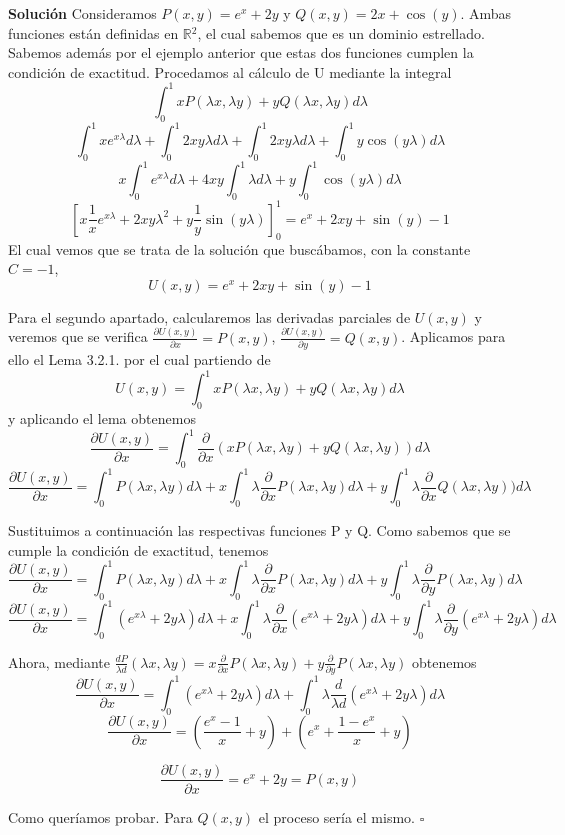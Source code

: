 \documentclass[fleqn]{article}
\newcommand*{\QED}{\hfill\ensuremath{\square}}
\def\R{$\mathds{R}$}
\def\sup{$^2$}
\begin{document}
    {\bf{Solución}} Consideramos $P(x,y)=e^x + 2y$ y $Q(x,y)=2x + \cos(y) $. Ambas funciones están definidas en \R\sup, el cual sabemos que es un dominio 
    estrellado. Sabemos además por el ejemplo anterior que estas dos funciones cumplen la condición de exactitud. Procedamos al cálculo de U mediante 
    la integral
    $$\int _{0}^{1} xP(\lambda x, \lambda y) + yQ(\lambda x, \lambda y) d\lambda$$
    $$\int _{0}^{1} xe^{x\lambda} d\lambda +\int _{0}^{1} 2xy\lambda d\lambda + \int _{0}^{1} 2xy\lambda d\lambda + \int _{0}^{1} y\cos(y\lambda) d\lambda$$
    $$x\int _{0}^{1} e^{x\lambda} d\lambda + 4xy\int _{0}^{1} \lambda d\lambda + y\int _{0}^{1} \cos(y\lambda) d\lambda$$
    $$[x \frac{1}{x} e^{x\lambda}+2xy\lambda^2+y\frac{1}{y} \sin(y\lambda)]_{0}^{1} = e^x + 2xy + \sin(y) - 1$$
    El cual vemos que se trata de la solución que buscábamos, con la constante $C=-1$,
    $$U(x,y)= e^x + 2xy + \sin(y) - 1$$
    
    Para el segundo apartado, calcularemos las derivadas parciales de $U(x,y)$ y veremos que se verifica $\frac{\partial U(x,y)}{\partial x}=P(x,y)$,
    $\frac{\partial U(x,y)}{\partial y}=Q(x,y)$. Aplicamos para ello el Lema 3.2.1. por el cual partiendo de
    $$U(x,y)=\int _{0}^{1} xP(\lambda x, \lambda y) + yQ(\lambda x, \lambda y) d\lambda$$
    y aplicando el lema obtenemos
    $$\frac{\partial U(x,y)}{\partial x}=\int _{0}^{1} \frac{\partial}{\partial x}(xP(\lambda x, \lambda y) + yQ(\lambda x, \lambda y)) d\lambda$$
    $$\frac{\partial U(x,y)}{\partial x}=\int _{0}^{1} P(\lambda x, \lambda y) d\lambda + x\int _{0}^{1} \lambda \frac{\partial}{\partial x} P(\lambda x, \lambda y) d\lambda + y\int _{0}^{1} \lambda \frac{\partial}{\partial x} Q(\lambda x, \lambda y)) d\lambda$$
    
    Sustituimos a continuación las respectivas funciones P y Q. Como sabemos que se cumple la condición de exactitud,
    tenemos
    $$\frac{\partial U(x,y)}{\partial x}=\int _{0}^{1} P(\lambda x, \lambda y) d\lambda + x\int _{0}^{1} \lambda \frac{\partial}{\partial x} P(\lambda x, \lambda y) d\lambda + y\int _{0}^{1} \lambda \frac{\partial}{\partial y} P(\lambda x, \lambda y) d\lambda$$
    $$\frac{\partial U(x,y)}{\partial x}=\int _{0}^{1} (e^{x\lambda} + 2y\lambda) d\lambda + x\int _{0}^{1} \lambda \frac{\partial}{\partial x} (e^{x\lambda} + 2y\lambda) d\lambda + y\int _{0}^{1} \lambda \frac{\partial}{\partial y} (e^{x\lambda} + 2y\lambda) d\lambda$$

    Ahora, mediante $\frac{dP}{\lambda d}(\lambda x, \lambda y)=x \frac{\partial}{\partial x} P(\lambda x, \lambda y) + y \frac{\partial}{\partial y} P(\lambda x, \lambda y)$ obtenemos
    $$\frac{\partial U(x,y)}{\partial x}=\int _{0}^{1} (e^{x\lambda} + 2y\lambda) d\lambda + \int _{0}^{1} \lambda \frac{d}{\lambda d}(e^{x\lambda} + 2y\lambda) d\lambda$$
    $$\frac{\partial U(x,y)}{\partial x}=\left(\frac{e^x - 1}{x} + y\right) + \left(e^x + \frac{1 - e^x}{x} + y\right)$$
    
    $$\frac{\partial U(x,y)}{\partial x}=e^x + 2y = P(x,y)$$

    Como queríamos probar. Para $Q(x,y)$ el proceso sería el mismo. \QED
\end{document}
